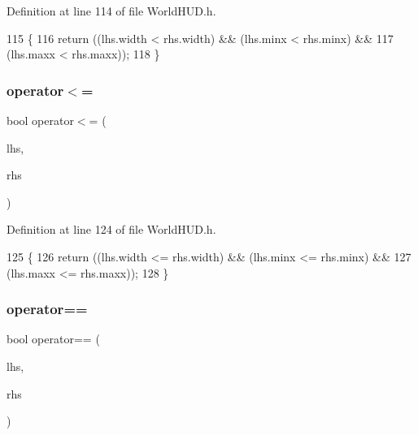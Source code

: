 Definition at line 114 of file World\+H\+U\+D.\+h.


\begin{DoxyCode}
115     \{
116       \textcolor{keywordflow}{return} ((lhs.width < rhs.width) && (lhs.minx < rhs.minx) &&
117               (lhs.maxx < rhs.maxx));
118     \}
\end{DoxyCode}
\mbox{\label{structnjli_1_1_j_l_i_text_row_abfc18ec33fd074ea140c6679cb6d104e}} 
\subsubsection{\texorpdfstring{operator$<$=}{operator<=}}
{\footnotesize\ttfamily bool operator$<$= (\begin{DoxyParamCaption}\item[{const \mbox{\hyperlink{structnjli_1_1_j_l_i_text_row}{J\+L\+I\+Text\+Row}} \&}]{lhs,  }\item[{const \mbox{\hyperlink{structnjli_1_1_j_l_i_text_row}{J\+L\+I\+Text\+Row}} \&}]{rhs }\end{DoxyParamCaption})\hspace{0.3cm}{\ttfamily [friend]}}



Definition at line 124 of file World\+H\+U\+D.\+h.


\begin{DoxyCode}
125     \{
126       \textcolor{keywordflow}{return} ((lhs.width <= rhs.width) && (lhs.minx <= rhs.minx) &&
127               (lhs.maxx <= rhs.maxx));
128     \}
\end{DoxyCode}
\mbox{\label{structnjli_1_1_j_l_i_text_row_ae1ea2e269caff412bc9b4df25af04c45}} 
\subsubsection{\texorpdfstring{operator==}{operator==}}
{\footnotesize\ttfamily bool operator== (\begin{DoxyParamCaption}\item[{const \mbox{\hyperlink{structnjli_1_1_j_l_i_text_row}{J\+L\+I\+Text\+Row}} \&}]{lhs,  }\item[{const \mbox{\hyperlink{structnjli_1_1_j_l_i_text_row}{J\+L\+I\+Text\+Row}} \&}]{rhs }\end{DoxyParamCaption})\hspace{0.3cm}{\ttfamily [friend]}}




